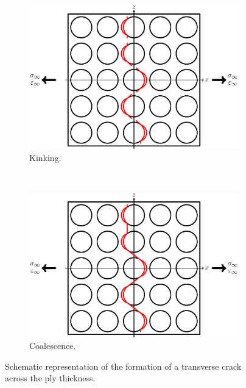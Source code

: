 \begin{figure}[!h]
   \begin{subfigure}[b]{0.45\textwidth}
        \includegraphics[width=\textwidth]{pics/stage3-kinking.pdf}
       \caption{Kinking.}\label{intro:fig:schematic-transversecracks-c}
    \end{subfigure}
    ~
    \begin{subfigure}[b]{0.45\textwidth}
        \includegraphics[width=\textwidth]{pics/stage4-coalescence.pdf}
       \caption{Coalescence.}\label{intro:fig:schematic-transversecracks-d}
    \end{subfigure}

\caption{Schematic representation of the formation of a transverse crack across the ply thickness.}\label{intro:fig:schematic-transversecracks}
\end{figure}


